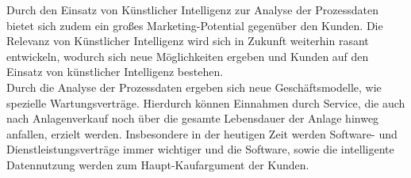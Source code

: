 \documentclass[ a4paper,
                oneside,
                toc=bibliography,
                toc=listof
                ]{scrbook}
\begin{document}
   	Durch den Einsatz von Künstlicher Intelligenz zur Analyse der Prozessdaten bietet sich zudem ein großes Marketing-Potential gegenüber den Kunden. Die Relevanz von Künstlicher Intelligenz wird sich in Zukunft weiterhin rasant entwickeln, wodurch sich neue Möglichkeiten ergeben und Kunden auf den Einsatz von künstlicher Intelligenz bestehen.\\
   	Durch die Analyse der Prozessdaten ergeben sich neue Geschäftsmodelle, wie spezielle Wartungsverträge. Hierdurch können Einnahmen durch Service, die auch nach Anlagenverkauf noch über die gesamte Lebensdauer der Anlage hinweg anfallen, erzielt werden. Insbesondere in der heutigen Zeit werden Software- und Dienstleistungsverträge immer wichtiger und die Software, sowie die intelligente Datennutzung werden zum Haupt-Kaufargument der Kunden.
   	\backmatter
   	
   	
   	\cleardoublepage
   	\listoffigures
   	\cleardoublepage
   	\listoftables
   	\cleardoublepage
   	
   	\cleardoublepage
   	\printbibliography
   	
   
\end{document}
